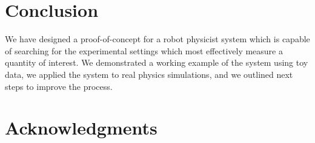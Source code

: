 \documentclass[10pt,journal,compsoc]{IEEEtran}
\begin{document}
\section{Conclusion}
We have designed a proof-of-concept for a robot physicist system which is capable of searching for the experimental settings which most effectively measure a quantity of interest. We demonstrated a working example of the system using toy data, we applied the system to real physics simulations, and we outlined next steps to improve the process.


%




\ifCLASSOPTIONcompsoc
  \section*{Acknowledgments}
\else
\end{document}
